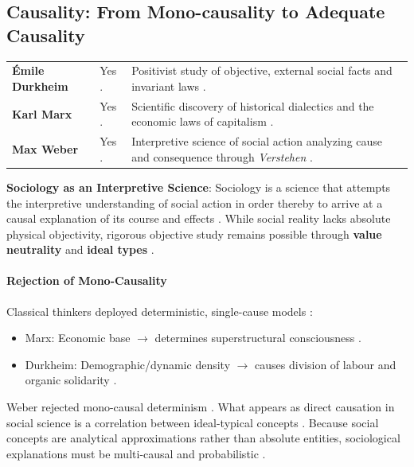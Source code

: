 \subsection{Causality: From Mono-causality to Adequate Causality}

\begin{table}[htbp]
\centering
\begin{tabularx}{\textwidth}{p{3.5cm} Y Y}
\hline
{}
 &  &  \\
\hline
\textbf{\'Emile Durkheim} & Yes . & Positivist study of objective, external social facts and invariant laws . \\
\textbf{Karl Marx} & Yes . & Scientific discovery of historical dialectics and the economic laws of capitalism . \\
\textbf{Max Weber} & Yes . & Interpretive science of social action analyzing cause and consequence through \textit{Verstehen} . \\
\hline
\end{tabularx}
\end{table}

\begin{KeyConcept}
\textbf{Sociology as an Interpretive Science}: Sociology is a science that attempts the interpretive understanding of social action in order thereby to arrive at a causal explanation of its course and effects . While social reality lacks absolute physical objectivity, rigorous objective study remains possible through \textbf{value neutrality} and \textbf{ideal types} .
\end{KeyConcept}

\paragraph{Rejection of Mono-Causality}
Classical thinkers deployed deterministic, single-cause models :
\begin{itemize}
    \item Marx: Economic base $\rightarrow$ determines superstructural consciousness .
    \item Durkheim: Demographic/dynamic density $\rightarrow$ causes division of labour and organic solidarity .
\end{itemize}

\begin{CriticalPoint}
Weber rejected mono-causal determinism . What appears as direct causation in social science is a correlation between ideal-typical concepts . Because social concepts are analytical approximations rather than absolute entities, sociological explanations must be multi-causal and probabilistic .
\end{CriticalPoint}

